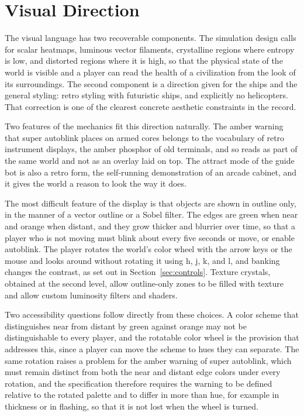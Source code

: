 \documentclass[11pt]{article}
\begin{document}
\section{Visual Direction}

The visual language has two recoverable components. The simulation design calls for scalar heatmaps, luminous vector filaments, crystalline regions where entropy is low, and distorted regions where it is high, so that the physical state of the world is visible and a player can read the health of a civilization from the look of its surroundings. The second component is a direction given for the ships and the general styling: retro styling with futuristic ships, and explicitly no helicopters. That correction is one of the clearest concrete aesthetic constraints in the record.

Two features of the mechanics fit this direction naturally. The amber warning that super autoblink places on armed cores belongs to the vocabulary of retro instrument displays, the amber phosphor of old terminals, and so reads as part of the same world and not as an overlay laid on top. The attract mode of the guide bot is also a retro form, the self-running demonstration of an arcade cabinet, and it gives the world a reason to look the way it does.

The most difficult feature of the display is that objects are shown in outline only, in the manner of a vector outline or a Sobel filter. The edges are green when near and orange when distant, and they grow thicker and blurrier over time, so that a player who is not moving must blink about every five seconds or move, or enable autoblink. The player rotates the world's color wheel with the arrow keys or the mouse and looks around without rotating it using h, j, k, and l, and banking changes the contrast, as set out in Section~\ref{sec:controls}. Texture crystals, obtained at the second level, allow outline-only zones to be filled with texture and allow custom luminosity filters and shaders.

Two accessibility questions follow directly from these choices. A color scheme that distinguishes near from distant by green against orange may not be distinguishable to every player, and the rotatable color wheel is the provision that addresses this, since a player can move the scheme to hues they can separate. The same rotation raises a problem for the amber warning of super autoblink, which must remain distinct from both the near and distant edge colors under every rotation, and the specification therefore requires the warning to be defined relative to the rotated palette and to differ in more than hue, for example in thickness or in flashing, so that it is not lost when the wheel is turned.
\end{document}
